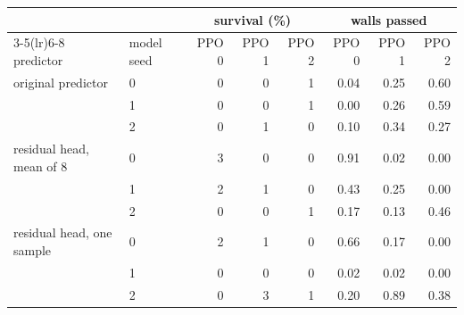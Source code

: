 \begin{tabular}{llrrrrrr}
\toprule
 & & \multicolumn{3}{c}{survival (\%)} & \multicolumn{3}{c}{walls passed} \\
\cmidrule(lr){3-5}\cmidrule(lr){6-8}
predictor & model seed & PPO 0 & PPO 1 & PPO 2 & PPO 0 & PPO 1 & PPO 2 \\
\midrule
original predictor & 0 & 0 & 0 & 1 & 0.04 & 0.25 & 0.60 \\
 & 1 & 0 & 0 & 1 & 0.00 & 0.26 & 0.59 \\
 & 2 & 0 & 1 & 0 & 0.10 & 0.34 & 0.27 \\
residual head, mean of 8 & 0 & 3 & 0 & 0 & 0.91 & 0.02 & 0.00 \\
 & 1 & 2 & 1 & 0 & 0.43 & 0.25 & 0.00 \\
 & 2 & 0 & 0 & 1 & 0.17 & 0.13 & 0.46 \\
residual head, one sample & 0 & 2 & 1 & 0 & 0.66 & 0.17 & 0.00 \\
 & 1 & 0 & 0 & 0 & 0.02 & 0.02 & 0.00 \\
 & 2 & 0 & 3 & 1 & 0.20 & 0.89 & 0.38 \\
\bottomrule
\end{tabular}
